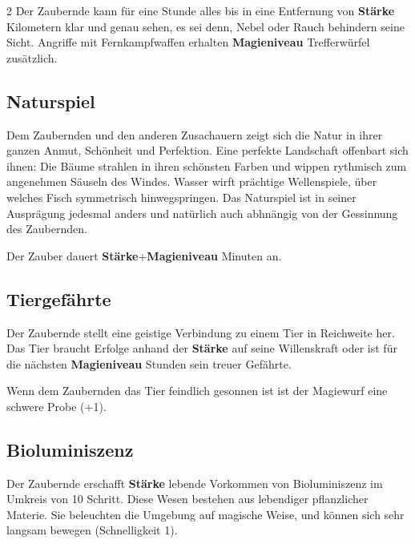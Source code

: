 \begin{multicols*}{2}
Der Zaubernde kann für eine Stunde alles bis in eine Entfernung von \textbf{Stärke} Kilometern klar und genau sehen, es sei denn, Nebel oder Rauch behindern seine Sicht. Angriffe mit Fernkampfwaffen erhalten \textbf{Magieniveau} Trefferwürfel zusätzlich.



\subsection{Naturspiel}

Dem Zaubernden und den anderen Zusachauern zeigt sich die Natur in ihrer ganzen Anmut, Schönheit und Perfektion. Eine perfekte Landschaft offenbart sich ihnen: Die Bäume strahlen in ihren schönsten Farben und wippen rythmisch zum angenehmen Säuseln des Windes. Wasser wirft prächtige Wellenspiele, über welches Fisch symmetrisch hinwegspringen. Das Naturspiel ist in seiner Ausprägung jedesmal anders und natürlich auch abhnängig von der Gessinnung des Zaubernden.

Der Zauber dauert \textbf{Stärke}+\textbf{Magieniveau} Minuten an.



\subsection{Tiergefährte}

Der Zaubernde stellt eine geistige Verbindung zu einem Tier in Reichweite her. Das Tier braucht Erfolge anhand der \textbf{Stärke} auf seine Willenskraft oder ist für die nächsten \textbf{Magieniveau} Stunden sein treuer Gefährte.

Wenn dem Zaubernden das Tier feindlich gesonnen ist ist der Magiewurf eine schwere Probe (+1).



\subsection{Bioluminiszenz}

Der Zaubernde erschafft \textbf{Stärke} lebende Vorkommen von Bioluminiszenz im Umkreis von 10 Schritt. Diese Wesen bestehen aus lebendiger pflanzlicher Materie. Sie beleuchten die Umgebung auf magische Weise, und können sich sehr langsam bewegen (Schnelligkeit 1).


\end{multicols*}
